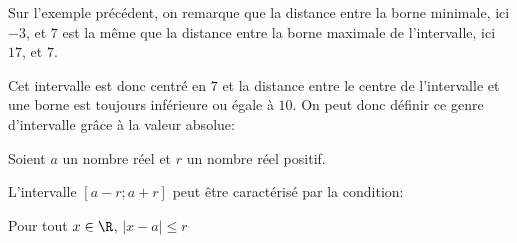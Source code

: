 \medskip
Sur l'exemple précédent, on remarque que la distance entre la borne minimale, ici $-3$, et $7$ est la même que la distance entre la borne maximale de l'intervalle, ici $17$, et $7$.

 Cet intervalle est donc centré en $7$ et la distance entre le centre de l'intervalle et une borne est toujours inférieure ou égale à $10$. On peut donc définir ce genre d'intervalle grâce à la valeur absolue:

\begin{prop}{}{}
Soient $a$ un nombre réel et $r$ un nombre réel positif.

 L'intervalle \quad $[a-r;a+r]$ \quad peut être caractérisé par la condition:  \begin{center}
Pour tout $x \in \R$, $|x-a| \leqslant r$
\end{center}
\end{prop}
